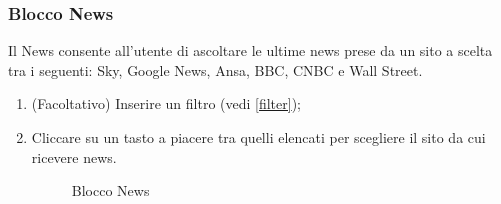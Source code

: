 \subsubsection{Blocco News}
Il News consente all'utente di ascoltare le ultime news prese da un sito a scelta tra i seguenti: Sky, Google News, Ansa, BBC, CNBC e Wall Street.
\begin{enumerate}
	\item (Facoltativo) Inserire un filtro (vedi \ref{filter});
	\item Cliccare su un tasto a piacere tra quelli elencati per scegliere il sito da cui ricevere news.
	\begin{figure}[!ht]
		\centering
		\caption{Blocco News}
	\end{figure}
\end{enumerate}
\newpage


